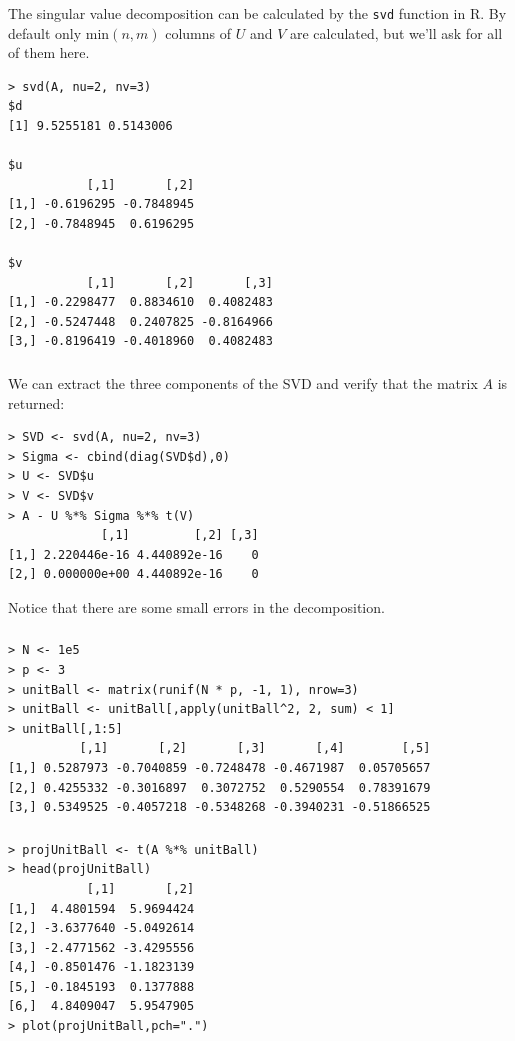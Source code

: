 \begin{frame}[fragile] \frametitle{}

The singular value decomposition can be calculated by
the \texttt{svd} function in R. By default only $\text{min}(n,m)$
columns of $U$ and $V$ are calculated, but we'll ask for all
of them here.
\begin{verbatim}
> svd(A, nu=2, nv=3)
$d
[1] 9.5255181 0.5143006

$u
           [,1]       [,2]
[1,] -0.6196295 -0.7848945
[2,] -0.7848945  0.6196295

$v
           [,1]       [,2]       [,3]
[1,] -0.2298477  0.8834610  0.4082483
[2,] -0.5247448  0.2407825 -0.8164966
[3,] -0.8196419 -0.4018960  0.4082483
\end{verbatim}

\end{frame}

\begin{frame}[fragile] \frametitle{}

We can extract the three components of the SVD and
verify that the matrix $A$ is returned:
\begin{verbatim}
> SVD <- svd(A, nu=2, nv=3)
> Sigma <- cbind(diag(SVD$d),0)
> U <- SVD$u
> V <- SVD$v
> A - U %*% Sigma %*% t(V)
             [,1]         [,2] [,3]
[1,] 2.220446e-16 4.440892e-16    0
[2,] 0.000000e+00 4.440892e-16    0
\end{verbatim}
\pause Notice that there are some small errors in the decomposition.

\end{frame}

\begin{frame}[fragile] \frametitle{}

\begin{verbatim}
> N <- 1e5
> p <- 3
> unitBall <- matrix(runif(N * p, -1, 1), nrow=3)
> unitBall <- unitBall[,apply(unitBall^2, 2, sum) < 1]
> unitBall[,1:5]
          [,1]       [,2]       [,3]       [,4]        [,5]
[1,] 0.5287973 -0.7040859 -0.7248478 -0.4671987  0.05705657
[2,] 0.4255332 -0.3016897  0.3072752  0.5290554  0.78391679
[3,] 0.5349525 -0.4057218 -0.5348268 -0.3940231 -0.51866525
\end{verbatim}

\end{frame}

\begin{frame}[fragile] \frametitle{}

\begin{verbatim}
> projUnitBall <- t(A %*% unitBall)
> head(projUnitBall)
           [,1]       [,2]
[1,]  4.4801594  5.9694424
[2,] -3.6377640 -5.0492614
[3,] -2.4771562 -3.4295556
[4,] -0.8501476 -1.1823139
[5,] -0.1845193  0.1377888
[6,]  4.8409047  5.9547905
> plot(projUnitBall,pch=".")
\end{verbatim}

\end{frame}

